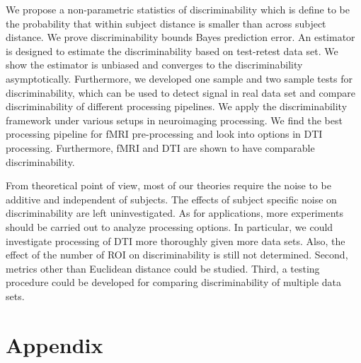 \documentclass{article}
\begin{document}
 We propose a non-parametric statistics of discriminability which is define to be the probability that within subject distance is smaller than across subject distance.  We prove discriminability bounds Bayes prediction error. An estimator is designed to estimate the discriminability based on test-retest data set. We show the estimator is unbiased and converges to the discriminability asymptotically. Furthermore, we developed one sample and two sample tests for discriminability, which can be used to detect signal in real data set and compare discriminability of different processing pipelines. We apply the discriminability framework under various setups in neuroimaging processing. We find the best processing pipeline for fMRI pre-processing and look into options in DTI processing. Furthermore, fMRI and DTI are shown to have comparable discriminability.



 From theoretical point of view, most of our theories require the noise to be additive and independent of subjects. The effects of subject specific noise on discriminability are left uninvestigated. As for applications, more experiments should be carried out to analyze processing options. In particular, we could investigate processing of DTI more thoroughly given more data sets. Also, the effect of the number of ROI on discriminability is still not determined. Second, metrics other than Euclidean distance could be studied. Third, a testing procedure could be developed for comparing discriminability of multiple data sets.



\section{Appendix}


% 
% 
% 
% 
% 
% 
% 
% 
\end{document}

